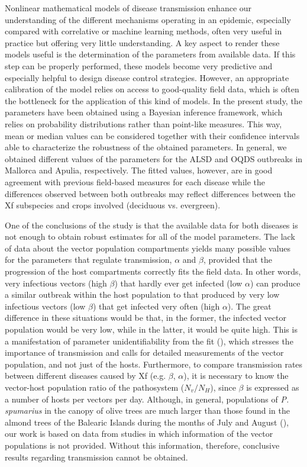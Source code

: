 Nonlinear mathematical models of disease transmission enhance our
understanding of the different mechanisms operating in an epidemic, especially
compared with correlative or machine learning methods, often very useful in
practice but offering very little understanding. A key aspect to render these
models useful is the determination of the parameters from available data. If
this step can be properly performed, these models become very predictive and
especially helpful to design disease control strategies. However, an
appropriate calibration of the model relies on access to good-quality field
data, which is often the bottleneck for the application of this kind of models.
In the present study, the parameters have been obtained using a Bayesian
inference framework, which relies on probability distributions rather than
point-like measures. This way, mean or median values can be considered together
with their confidence intervals able to characterize the robustness of the
obtained parameters. In general, we obtained different values of the parameters
for the ALSD and OQDS outbreaks in Mallorca and Apulia, respectively. The
fitted values, however, are in good agreement with previous field-based
measures for each disease while the differences observed between both outbreaks
may reflect differences between the Xf subspecies and crops involved (deciduous
vs. evergreen).

One of the conclusions of the study is that the available data for both
diseases is not enough to obtain robust estimates for all of the model
parameters. The lack of data about the vector population compartments yields
many possible values for the parameters that regulate transmission, $\alpha$
and $\beta$, provided that the progression of the host compartments correctly
fits the field data. In other words, very infectious vectors (high $\beta$)
that hardly ever get infected (low $\alpha$) can produce a similar outbreak
within the host population to that produced by very low infectious vectors (low
$\beta$) that get infected very often (high $\alpha$). The great difference in
these situations would be that, in the former, the infected vector population
would be very low, while in the latter, it would be quite high. This is a
manifestation of parameter unidentifiability from the fit
(\cite{Chowel2017,Roosa2019}), which stresses the importance of transmission
and calls for detailed measurements of the vector population, and not just of
the hosts. Furthermore, to compare transmission rates between different
diseases caused by Xf (e.g. $\beta$, $\alpha$), it is necessary to know the
vector-host population ratio of the pathosystem ($N_v/N_H$), since $\beta$ is
expressed as a number of hosts per vectors per day. Although, in general,
populations of \textit{P. spumarius} in the canopy of olive trees are much
larger than those found in the almond trees of the Balearic Islands during the
months of July and August (\cite{Lopez2021}),
our work is based on data from studies in which information of the vector
populations is not provided. Without this information, therefore, conclusive
results regarding transmission cannot be obtained.

